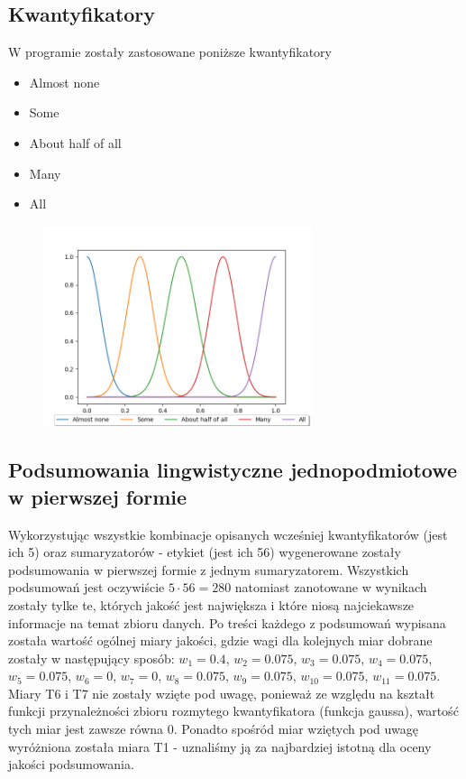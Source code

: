 \documentclass{classrep}
\begin{document}
{        \subsection{Kwantyfikatory} {
            W programie zostały zastosowane poniższe kwantyfikatory
            \begin{itemize}
                \item Almost none
                \item Some
                \item About half of all
                \item Many
                \item All
            \end{itemize}

            \begin{figure}[!htbp]
                \centering
                \includegraphics[width=0.7\textwidth]{img/theory/Quantifier.png}
                \caption{}
            \end{figure}
            \FloatBarrier
        }

        \subsection{Podsumowania lingwistyczne jednopodmiotowe w pierwszej formie} \label{jednopodmiot} {
            Wykorzystując wszystkie kombinacje opisanych wcześniej kwantyfikatorów (jest ich 5) oraz
            sumaryzatorów - etykiet (jest ich 56) wygenerowane zostały podsumowania w pierwszej
            formie z jednym sumaryzatorem. Wszystkich podsumowań jest oczywiście $5 \cdot 56 = 280$
            natomiast zanotowane w wynikach zostały tylke te, których jakość jest największa i które
            niosą najciekawsze informacje na temat zbioru danych. Po treści każdego z podsumowań
            wypisana została wartość ogólnej miary jakości, gdzie wagi dla kolejnych miar dobrane
            zostały w następujący sposób: $w_1 = 0.4$, $w_2 = 0.075$, $w_3 = 0.075$, $w_4 = 0.075$,
            $w_5 = 0.075$, $w_6 = 0$, $w_7 = 0$, $w_8 = 0.075$, $w_9 = 0.075$, $w_{10} = 0.075$,
            $w_{11} = 0.075$. Miary T6 i T7 nie zostały wzięte pod uwagę, ponieważ ze względu na
            kształt funkcji przynależności zbioru rozmytego kwantyfikatora (funkcja gaussa), wartość
            tych miar jest zawsze równa $0$. Ponadto spośród miar wziętych pod uwagę wyróżniona
            została miara T1 - uznaliśmy ją za najbardziej istotną dla oceny jakości podsumowania.
        }

}
\end{document}
